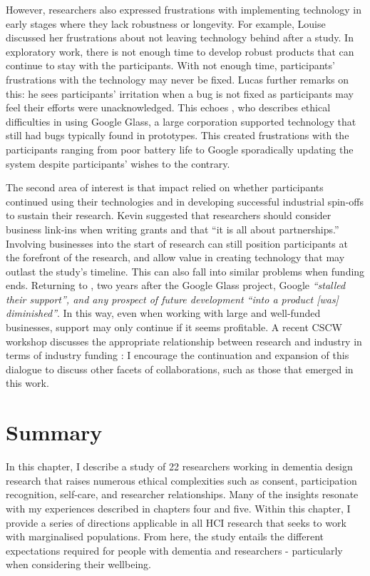 However, researchers also expressed frustrations with implementing technology in early stages where they lack robustness or longevity. For example, Louise discussed her frustrations about not leaving technology behind after a study. In exploratory work, there is not enough time to develop robust products that can continue to stay with the participants. With not enough time, participants' frustrations with the technology may never be fixed. Lucas further remarks on this: he sees participants' irritation when a bug is not fixed as participants may feel their efforts were unacknowledged. This echoes \cite{vines_our_2017}, who describes ethical difficulties in using Google Glass, a large corporation supported technology that still had bugs typically found in prototypes. This created frustrations with the participants ranging from poor battery life to Google sporadically updating the system despite participants' wishes to the contrary. 

The second area of interest is that impact relied on whether participants continued using their technologies and in developing successful industrial spin-offs to sustain their research. Kevin suggested that researchers should consider business link-ins when writing grants and that “it is all about partnerships.” Involving businesses into the start of research can still position participants at the forefront of the research, and allow value in creating technology that may outlast the study’s timeline. This can also fall into similar problems when funding ends. Returning to \cite{vines_our_2017}, two years after the Google Glass project, Google \textit{“stalled their support”, and any prospect of future development “into a product [was] diminished”}. In this way, even when working with large and well-funded businesses, support may only continue if it seems profitable. A recent CSCW workshop discusses the appropriate relationship between research and industry in terms of industry funding \citep{group_patron_2019}: I encourage the continuation and expansion of this dialogue to discuss other facets of collaborations, such as those that emerged in this work.

\section{Summary}
\label{Ethics:Summary}
In this chapter, I describe a study of 22 researchers working in dementia design research that raises numerous ethical complexities such as consent, participation recognition, self-care, and researcher relationships. Many of the insights resonate with my experiences described in chapters four and five. Within this chapter, I provide a series of directions applicable in all HCI research that seeks to work with marginalised populations. From here, the study entails the different expectations required for people with dementia and researchers - particularly when considering their wellbeing.

